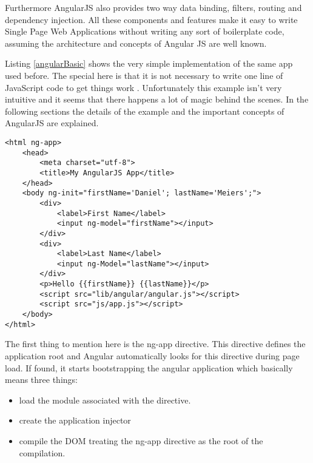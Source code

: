 
Furthermore AngularJS also provides two way data binding, filters, routing and dependency injection.
All these components and features make it easy to write Single Page Web Applications without writing any sort of boilerplate code, assuming the architecture and concepts of Angular JS are well known.



Listing \ref{angularBasic} shows the very simple implementation of the same app used before.
The special here is that it is not necessary to write one line of JavaScript code to get things work .
Unfortunately this example isn't very intuitive and it seems that there happens a lot of magic behind the scenes.
In the following sections the details of the example and the important concepts of AngularJS are explained.

\begin{lstlisting}[label=angularBasic,caption=First Angular application]
<html ng-app>
    <head>
        <meta charset="utf-8">
        <title>My AngularJS App</title>
    </head>
    <body ng-init="firstName='Daniel'; lastName='Meiers';">
        <div>
            <label>First Name</label> 
            <input ng-model="firstName"></input>
        </div>
        <div>
            <label>Last Name</label> 
            <input ng-Model="lastName"></input>
        </div>
        <p>Hello {{firstName}} {{lastName}}</p>
        <script src="lib/angular/angular.js"></script>
        <script src="js/app.js"></script>
    </body>
</html>
\end{lstlisting}

The first thing to mention here is the ng-app directive.
This directive defines the application root and Angular automatically looks for this directive during page load.
If found, it starts bootstrapping the angular application which basically means three things:
\begin{itemize}
	\item load the module associated with the directive.
	\item create the application injector
	\item compile the DOM treating the ng-app directive as the root of the compilation.
\end{itemize}

